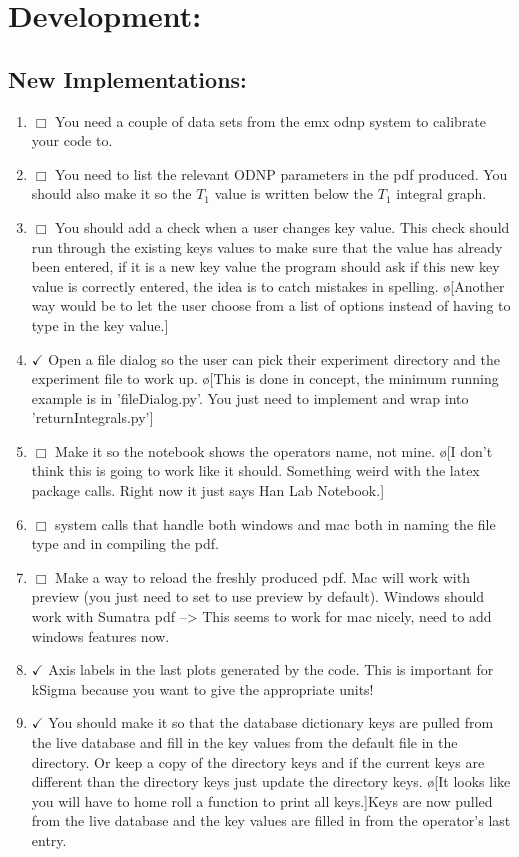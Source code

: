 \documentclass[10pt]{book}
\begin{document}
\chapter{Development:}
\section{New Implementations:}
\begin{enumerate}
    \item $\Box$ You need a couple of data sets from the emx odnp system to calibrate your code to.
    \item $\Box$ You need to list the relevant ODNP parameters in the pdf produced. You should also make it so the $T_1$ value is written below the $T_1$ integral graph.
    \item $\Box$ You should add a check when a user changes key value. This check should run through the existing keys values to make sure that the value has already been entered, if it is a new key value the program should ask if this new key value is correctly entered, the idea is to catch mistakes in spelling. \o[Another way would be to let the user choose from a list of options instead of having to type in the key value.]{}
    \item $\checkmark$ Open a file dialog so the user can pick their experiment directory and the experiment file to work up. \o[This is done in concept, the minimum running example is in 'fileDialog.py'. You just need to implement and wrap into 'returnIntegrals.py']{}
    \item $\Box$ Make it so the notebook shows the operators name, not mine. \o[I don't think this is going to work like it should. Something weird with the latex package calls. Right now it just says Han Lab Notebook.]{}
    \item $\Box$ system calls that handle both windows and mac both in naming the file type and in compiling the pdf.
    \item $\Box$ Make a way to reload the freshly produced pdf. Mac will work with preview (you just need to set to use preview by default). Windows should work with Sumatra pdf --> This seems to work for mac nicely, need to add windows features now.
    \item $\checkmark$ Axis labels in the last plots generated by the code. This is important for kSigma because you want to give the appropriate units!
    \item $\checkmark$ You should make it so that the database dictionary keys are pulled from the live database and fill in the key values from the default file in the directory. Or keep a copy of the directory keys and if the current keys are different than the directory keys just update the directory keys. \o[It looks like you will have to home roll a function to print all keys.]{Keys are now pulled from the live database and the key values are filled in from the operator's last entry.}

\end{enumerate}
\end{document}

